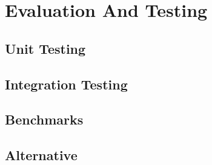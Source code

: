 \section{Evaluation And Testing} \label{evalandtesting}
\subsection{Unit Testing}
\subsection{Integration Testing}
\subsection{Benchmarks}
\subsection{Alternative}

